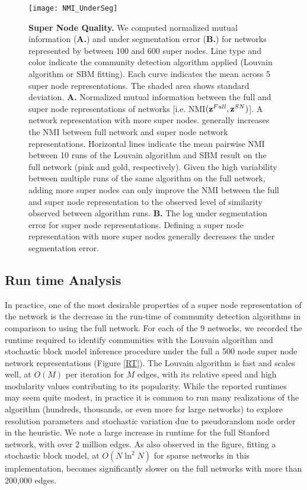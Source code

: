 \begin{figure}[t!]
\centering
\texttt{[image: NMI\_UnderSeg]}
\caption{{\bf Super Node Quality.} We computed normalized mutual information ({\bf A.}) and under segmentation error ({\bf B.}) for networks represented by between 100 and 600 super nodes. Line type and color indicate the community detection algorithm applied (Louvain algorithm or SBM fitting). Each curve indicates the mean across 5 super node representations. The shaded area shows standard deviation. {\bf A.} Normalized mutual information between the full and super node representations of networks [i.e. NMI$({\bf z}^{Full},{\bf z}^{SN})$]. A network representation with more super nodes. generally increases the NMI between full network and super node network representations. Horizontal lines indicate the mean pairwise NMI between 10 runs of the Louvain algorithm and SBM result on the full network (pink and gold, respectively). Given the high variability between multiple runs of the same algorithm on the full network, adding more super nodes can only improve the NMI between the full and super node representation to the observed level of similarity observed between algorithm runs. {\bf B.} The log under segmentation error for super node representations. Defining a super node representation with more super nodes generally decreases the under segmentation error. }
\label{FigQuality}
\end{figure}

\subsection{Run time Analysis}
In practice, one of the most desirable properties of a super node representation of the network is the decrease in the run-time of community detection algorithms in comparison to using the full network. For each of the 9 networks, we recorded the runtime required to identify communities with the Louvain algorithm and stochastic block model inference procedure under the full a 500 node super node network representations (Figure \ref{RT}). The Louvain algorithm is fast and scales well, at $O(M)$ per iteration for $M$ edges, with its relative speed and high modularity values contributing to its popularity. While the reported runtimes may seem quite modest, in practice it is common to run many realizations of the algorithm (hundreds, thousands, or even more for large networks) to explore resolution parameters and stochastic variation due to pseudorandom node order in the heuristic. We note a large increase in runtime for the full Stanford network, with over 2 million edges. As also observed in the figure, fitting a stochastic block model, at $O(N{\ln}^{2}N)$ for sparse networks in this implementation,\cite{tiagosbm} becomes significantly slower on the full networks with more than 200,000 edges. 

